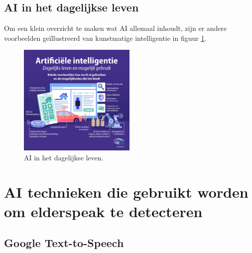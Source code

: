 \subsection{AI in het dagelijkse leven}
Om een klein overzicht te maken wat AI allemaal inhoudt, zijn er andere voorbeelden geïllustreerd van kunstmatige intelligentie in figuur \ref{fig:ai_dagelijkse_leven}.
\begin{figure}
    \centering
    \includegraphics[width=0.5\textwidth]{./img/ai_voorbeelden.jpg}
    \caption{\label{fig:ai_dagelijkse_leven} AI in het dagelijkse leven. \autocite{EuropeesParlement2020}}
\end{figure}

\section{AI technieken die gebruikt worden om elderspeak te detecteren}
\subsection{Google Text-to-Speech}
